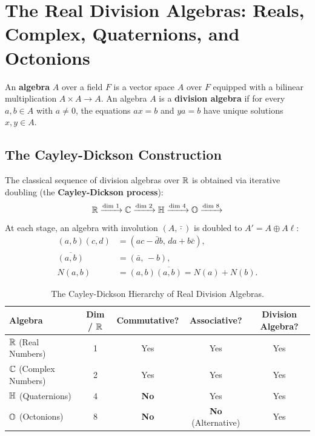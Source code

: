 \section{The Real Division Algebras: Reals, Complex, Quaternions, and Octonions}
\label{sec:division_algebras}

\begin{definition}
An \textbf{algebra} $A$ over a field $F$ is a vector space $A$ over $F$ equipped with a bilinear multiplication $A \times A \to A$. An algebra $A$ is a \textbf{division algebra} if for every $a, b \in A$ with $a \ne 0$, the equations $ax = b$ and $ya = b$ have unique solutions $x, y \in A$.
\end{definition}

\subsection{The Cayley-Dickson Construction}

The classical sequence of division algebras over $\mathbb{R}$ is obtained via iterative doubling (the \textbf{Cayley-Dickson process}):
\begin{equation}
\mathbb{R} \xrightarrow{\text{dim } 1} \mathbb{C} \xrightarrow{\text{dim } 2} \mathbb{H} \xrightarrow{\text{dim } 4} \mathbb{O} \xrightarrow{\text{dim } 8}
\end{equation}
At each stage, an algebra with involution $(A, \bar{\cdot})$ is doubled to $A' = A \oplus A\ell$:
\begin{align}
(a, b)(c, d) &= (ac - \bar{d}b, \, da + b\bar{c}), \\
\overline{(a, b)} &= (\bar{a}, \, -b), \\
N(a, b) &= (a, b)\overline{(a, b)} = N(a) + N(b).
\end{align}

\begin{table}[htbp]
\centering
\small
\setlength{\tabcolsep}{5pt}
\begin{tabular}{|l|c|c|c|c|}
\hline
\textbf{Algebra} & \textbf{Dim / $\mathbb{R}$} & \textbf{Commutative?} & \textbf{Associative?} & \textbf{Division Algebra?} \\
\hline
$\mathbb{R}$ (Real Numbers) & 1 & Yes & Yes & Yes \\
$\mathbb{C}$ (Complex Numbers) & 2 & Yes & Yes & Yes \\
$\mathbb{H}$ (Quaternions) & 4 & \textbf{No} & Yes & Yes \\
$\mathbb{O}$ (Octonions) & 8 & \textbf{No} & \textbf{No} (Alternative) & Yes \\
\hline
\end{tabular}
\caption{The Cayley-Dickson Hierarchy of Real Division Algebras.}
\label{tab:division_algebras}
\end{table}

